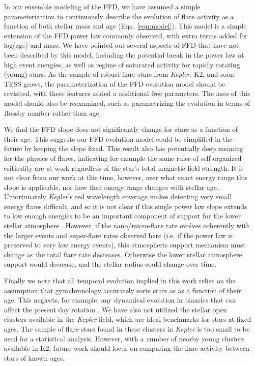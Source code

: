 \documentclass[preprint2]{aastex62}
\newcommand{\Kepler}{\textsl{Kepler}\xspace}
\begin{document}
In our ensemble modeling of the FFD, we have assumed a simple parameterization to continuously describe the evolution of flare activity as a function of both stellar mass and age (Eqn. \ref{eqn:model}). This model is a simple extension of the FFD power law commonly observed, with extra terms added for log(age) and mass. We have pointed out several aspects of FFD that have not been described by this model, including the potential break in the power law at high event energies, as well as regime of saturated activity for rapidly rotating (young) stars. As the sample of robust flare stars from \Kepler, K2, and soon TESS grows, the parameterization of the FFD evolution model should be revisited, with these features added a additional free parameters. The axes of this model should also be reexamined, such as parametrizing the evolution in terms of Rossby number rather than age.

We find the FFD slope does not significantly change for stars as a function of their age. This suggests our FFD evolution model could be simplified in the future by keeping the slope fixed. This result also has potentially deep meaning for the physics of flares, indicating for example the same rules of self-organized criticality are at work regardless of the star's total magnetic field strength. It is not clear from our work at this time, however, over what exact energy range this slope is applicable, nor how that energy range changes with stellar age. Unfortunately \Kepler's red wavelength coverage makes detecting very small energy flares difficult, and so it is not clear if this single power law slope extends to low enough energies to be an important component of support for the lower stellar atmosphere \citep[e.g. ``Ellerman Bombs'';][]{hansteen2017}. 
However, if the nano/micro-flare rate evolves coherently with the larger events and super-flare rates observed here (i.e. if the power law is preserved to very low energy events), this atmospheric support mechanism must change as the total flare rate decreases. Otherwise the lower stellar atmosphere support would decrease, and the stellar radius could change over time.

Finally we note that all temporal evolution implied in this work relies on the assumption that gyrochronology accurately sorts stars as as a function of their age. This neglects, for example, any dynamical evolution in binaries that can affect the present day rotation \citep[e.g.][]{lurie2017,clarke2018}. We have also not utilized the stellar open clusters available in the \Kepler field, which are ideal benchmarks for stars at fixed ages. The sample of flare stars found in these clusters in \Kepler is too small to be used for a statistical analysis. However, with a number of nearby young clusters available in K2, future work should focus on comparing the flare activity between stars of known ages.
\end{document}
